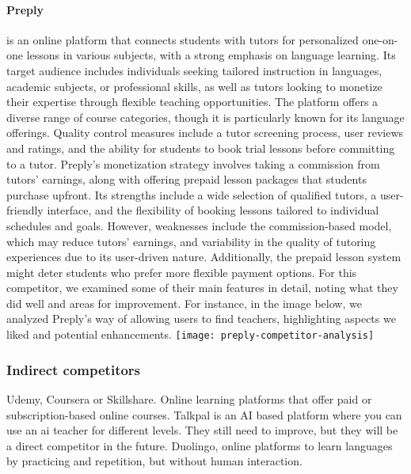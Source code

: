 \paragraph{Preply} is an online platform that connects students with tutors for personalized one-on-one lessons in various subjects, with a strong emphasis on language learning.
Its target audience includes individuals seeking tailored instruction in languages, academic subjects, or professional skills, as well as tutors looking to monetize their expertise through flexible teaching opportunities.
The platform offers a diverse range of course categories, though it is particularly known for its language offerings.
Quality control measures include a tutor screening process, user reviews and ratings, and the ability for students to book trial lessons before committing to a tutor.
Preply's monetization strategy involves taking a commission from tutors' earnings, along with offering prepaid lesson packages that students purchase upfront.
Its strengths include a wide selection of qualified tutors, a user-friendly interface, and the flexibility of booking lessons tailored to individual schedules and goals.
However, weaknesses include the commission-based model, which may reduce tutors' earnings, and variability in the quality of tutoring experiences due to its user-driven nature.
Additionally, the prepaid lesson system might deter students who prefer more flexible payment options.
For this competitor, we examined some of their main features in detail, noting what they did well and areas for improvement.
For instance, in the image below, we analyzed Preply's way of allowing users to find teachers, highlighting aspects we liked and potential enhancements.
\newline\newline
\texttt{[image: preply-competitor-analysis]}\newline

\subsubsection{Indirect competitors}
Udemy, Coursera or Skillshare.
Online learning platforms that offer paid or subscription-based online courses.
Talkpal is an AI based platform where you can use an ai teacher for different levels.
They still need to improve, but they will be a direct competitor in the future.
Duolingo, online platforms to learn languages by practicing and repetition, but without human interaction.

